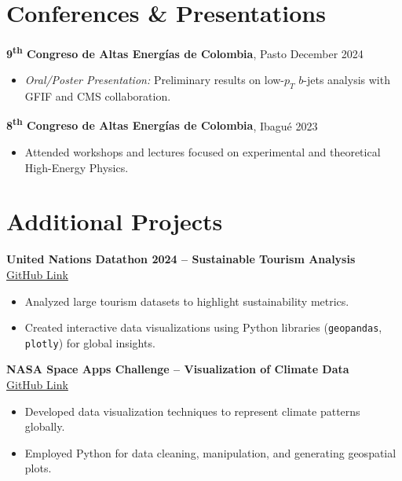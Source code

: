 \documentclass[a4paper,11pt]{article}
\begin{document}
\section*{Conferences \& Presentations}
\textbf{9\textsuperscript{th} Congreso de Altas Energías de Colombia}, Pasto \hfill December 2024
\begin{itemize}
    \item \textit{Oral/Poster Presentation:} Preliminary results on low-$p_T$ $b$-jets analysis with GFIF and CMS collaboration.
\end{itemize}

\textbf{8\textsuperscript{th} Congreso de Altas Energías de Colombia}, Ibagué \hfill 2023 
\begin{itemize}
    \item Attended workshops and lectures focused on experimental and theoretical High-Energy Physics.
\end{itemize}

\section*{Additional Projects}
\textbf{United Nations Datathon 2024 -- Sustainable Tourism Analysis} \\
\href{https://github.com/JuanJ27/UN-Datathon-sisifos}{GitHub Link}
\begin{itemize}
    \item Analyzed large tourism datasets to highlight sustainability metrics.
    \item Created interactive data visualizations using Python libraries 
    (\texttt{geopandas}, \texttt{plotly}) for global insights.
\end{itemize}

\textbf{NASA Space Apps Challenge -- Visualization of Climate Data} \\
\href{https://github.com/tonnysoyyo/NASA-Space-Apps}{GitHub Link}
\begin{itemize}
    \item Developed data visualization techniques to represent climate patterns globally.
    \item Employed Python for data cleaning, manipulation, and generating geospatial plots.
\end{itemize}

\end{document}
